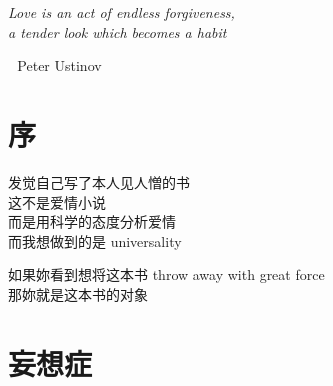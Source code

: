 \documentclass[12pt]{report}
\newcommand{\cc}[2]{#1}
\newcommand{\cc}[2]{#2}
\newcommand{\tab}{\hspace*{1cm}}
\newcommand*\dashh{\,\,\textemdash\kern-1pt\textemdash\,\,}
\begin{document}
\newpage
{}

\tab\tab\tab \parbox{9cm}{\textit{Love is an act of endless forgiveness,\\
a tender look which becomes a habit}}
\vspace{0.5cm}
\begin{flushright}
\dashh Peter Ustinov \hspace*{3cm}
\end{flushright}

\tableofcontents
{}

\chapter*{\cc{序}{Preface}}

\cc{
发觉自己写了本人见人憎的书\\
这不是爱情小说\\
而是用科学的态度分析爱情\\
而我想做到的是 universality

如果妳看到想将这本书 throw away with great force\\
那妳就是这本书的对象
}{

}

\chapter{\cc{妄想症}{Paranoia}}
\end{document}
